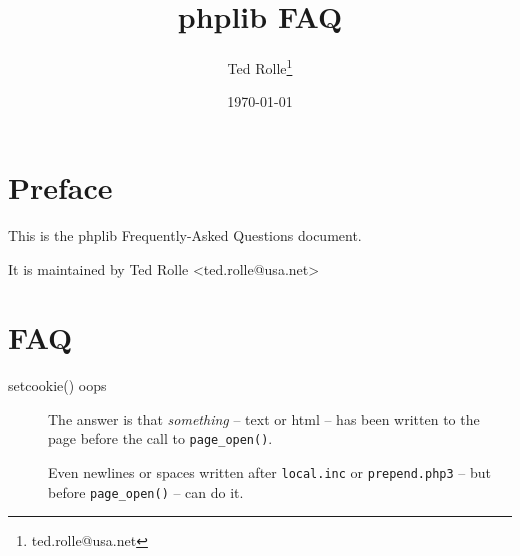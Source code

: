 \documentclass[12pt,draft,oneside]{book}
\begin{document}
\pagestyle{headings}
\frontmatter
\title{phplib FAQ}
\author{Ted Rolle\thanks{ted.rolle@usa.net}}
\date{\today}
\maketitle
\tableofcontents
\chapter{Preface}
This is the phplib Frequently-Asked Questions document.

It is maintained by Ted Rolle <ted.rolle@usa.net>
\mainmatter
\chapter{FAQ}

\centerline{}
\vspace{0.5cm}
\begin{description}
\item[setcookie() oops]
The answer is that \textit{something} -- text or html --
has been written to the page
before the call to \verb|page_open()|.

Even newlines or spaces written after \verb|local.inc| or
\verb|prepend.php3| -- but before \verb|page_open()| -- can do it.

\end{description}
\backmatter
\end{document}
